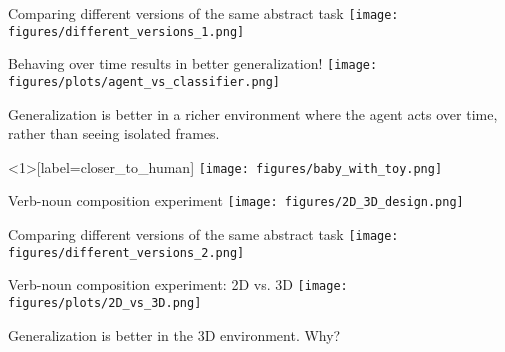 \documentclass{beamer}
\begin{document}
\begin{frame}{Comparing different versions of the same abstract task}
\centering
\texttt{[image: figures/different\_versions\_1.png]}
\end{frame}

\begin{frame}{Behaving over time results in better generalization!}
\vspace{1em}
\centering
\texttt{[image: figures/plots/agent\_vs\_classifier.png]}
\end{frame}

\begin{frame}[standout]
Generalization is better in a richer environment where the agent acts over time, rather than seeing isolated frames.
\end{frame}

\begin{frame}<1>[label=closer_to_human]
\centering
\texttt{[image: figures/baby\_with\_toy.png]}
\end{frame}

\begin{frame}{Verb-noun composition experiment}
\centering
\texttt{[image: figures/2D\_3D\_design.png]}
\end{frame}

\begin{frame}{Comparing different versions of the same abstract task}
\centering
\texttt{[image: figures/different\_versions\_2.png]}
\end{frame}

\begin{frame}{Verb-noun composition experiment: 2D vs. 3D}
\vspace{1em}
\centering
\texttt{[image: figures/plots/2D\_vs\_3D.png]}
\end{frame}

\begin{frame}[standout]
Generalization is better in the 3D environment. Why?
\end{frame}
\end{document}

